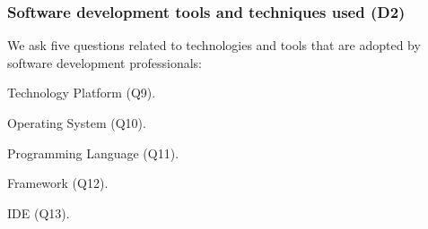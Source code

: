\subsubsection{Software development tools and techniques used (D2)}
\label{tools}
We ask five questions related to technologies and tools that are
adopted by software development professionals: \begin{inparaenum}
\item Technology Platform (Q9).
\item Operating System (Q10).
\item Programming Language (Q11).
\item Framework (Q12).
\item IDE (Q13).
\end{inparaenum}

